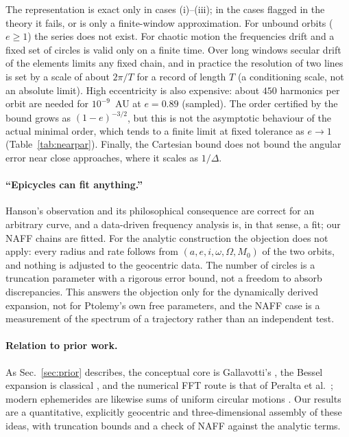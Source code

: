 The representation is exact only in cases (i)--(iii); in the cases flagged in
the theory it fails, or is only a finite-window approximation. For unbound orbits ($e\ge1$) the series does not exist. For
chaotic motion the frequencies drift and a fixed set of circles is valid
only on a finite time. Over long windows secular drift of the elements
limits any fixed chain, and in practice the resolution of two lines is
set by a scale of about $2\pi/T$ for a record of length $T$ (a conditioning
scale, not an absolute limit). High eccentricity is
also expensive: about $450$ harmonics per orbit are needed for
$10^{-9}$~AU at $e=0.89$ (sampled). The order certified by the bound grows as
$(1-e)^{-3/2}$, but this is not the asymptotic behaviour of the actual minimal
order, which tends to a finite limit at fixed tolerance as $e\to1$
(Table~\ref{tab:nearpar}). Finally, the Cartesian bound does not bound the
angular error near close approaches, where it scales as $1/\Delta$.

\paragraph*{``Epicycles can fit anything.''}
Hanson's observation \cite{Hanson1960} and its philosophical consequence
\cite{Carman2010} are correct for an arbitrary curve, and a data-driven
frequency analysis is, in that sense, a fit; our NAFF chains are fitted. For
the analytic construction the objection does not apply: every radius and
rate follows from $(a,e,i,\omega,\Omega,M_0)$ of the two orbits, and nothing is
adjusted to the geocentric data. The number of circles is a truncation
parameter with a rigorous error bound, not a freedom to absorb discrepancies.
This answers the objection only for the dynamically derived expansion, not for
Ptolemy's own free parameters, and the NAFF case is a measurement of
the spectrum of a trajectory rather than an independent test.

\paragraph*{Relation to prior work.}
As Sec.~\ref{sec:prior} describes, the conceptual core is Gallavotti's
\cite{Gallavotti2001}, the Bessel expansion is classical
\cite{Dutka1995,Kapteyn1893}, and the numerical FFT route is that of Peralta
et al.\ \cite{Peralta2003}; modern ephemerides are likewise sums of uniform
circular motions \cite{Bretagnon1988,Kudryavtsev2016}. Our results are a
quantitative, explicitly geocentric and three-dimensional assembly of these
ideas, with truncation bounds and a check of NAFF against the analytic
terms.

